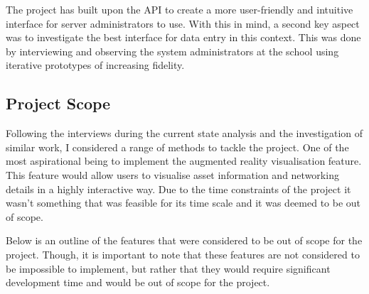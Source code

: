 \documentclass [11pt,a4paper]{article}
\begin{document}
The project has built upon the API to create a more user-friendly and intuitive interface for server administrators to use. With this in mind, a second key aspect was to investigate the best interface for data entry in this context. This was done by interviewing and observing the system administrators at the school using iterative prototypes of increasing fidelity.

\subsection{Project Scope}
\label{sec:stretchgoals}


Following the interviews during the current state analysis and the investigation of similar work, I considered a range of methods to tackle the project. One of the most aspirational being to implement the augmented reality visualisation feature. This feature would allow users to visualise asset information and networking details in a highly interactive way. Due to the time constraints of the project it wasn't something that was feasible for its time scale and it was deemed to be out of scope. 

Below is an outline of the features that were considered to be out of scope for the project. Though, it is important to note that these features are not considered to be impossible to implement, but rather that they would require significant development time and would be out of scope for the project.
\end{document}
